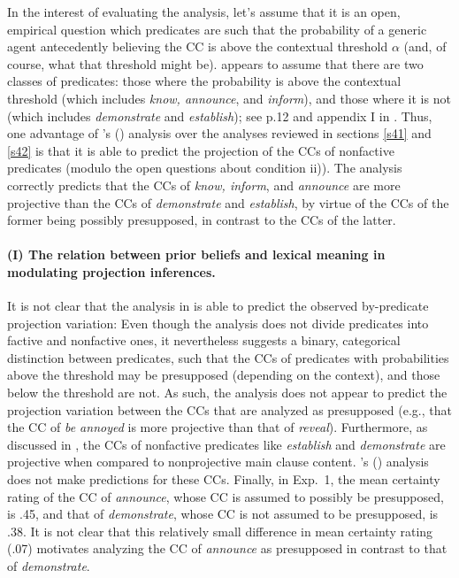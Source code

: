\documentclass[11pt,fleqn]{article}
\newcommand{\6}{\mbox{$[\hspace*{-.6mm}[$}}
\newcommand{\9}{\mbox{$]\hspace*{-.6mm}]$}}
\newcommand{\citetpos}[1]{\citeauthor{#1}'s (\citeyear{#1})}
\begin{document}
In the interest of evaluating the analysis, let's assume that it is an open, empirical question which predicates are such that the probability of a generic agent antecedently believing the CC is above the contextual threshold $\alpha$ (and, of course, what that threshold might be). \cite{schlenker2021} appears to assume that there are two classes of predicates: those where the probability is above the contextual threshold (which includes {\em know, announce}, and {\em inform}), and those where it is not (which includes {\em demonstrate} and {\em establish}); see p.12 and appendix I in \cite{schlenker2021}. Thus, one advantage of \citetpos{schlenker2021} analysis over the analyses reviewed in sections \ref{s41} and \ref{s42} is that it is able to predict the projection of the CCs of nonfactive predicates (modulo the open questions about condition ii)). The analysis correctly predicts that the CCs of \emph{know, inform}, and \emph{announce} are more projective than the CCs of \emph{demonstrate} and \emph{establish}, by virtue of the CCs of the former being possibly presupposed, in contrast to the CCs of the latter. 

\paragraph{(I) The relation between prior beliefs and lexical meaning in modulating projection inferences.} It is not clear that the analysis in \cite{schlenker2021} is able to predict the observed by-predicate projection variation: Even though the analysis does not divide predicates into factive and nonfactive ones, it nevertheless suggests a binary, categorical distinction between predicates, such that the CCs of predicates with probabilities above the threshold may be presupposed (depending on the context), and those below the threshold are not. As such, the analysis does not appear to predict the projection variation between the CCs that are analyzed as presupposed (e.g., that the CC of {\em be annoyed} is more projective than that of {\em reveal}). Furthermore, as discussed in \cite{degen-tonhauser-language}, the CCs of nonfactive predicates like \emph{establish} and \emph{demonstrate} are projective when compared to nonprojective main clause content. \citetpos{schlenker2021} analysis does not make predictions for these CCs. Finally, in Exp.~1, the mean certainty rating of the CC of \emph{announce}, whose CC is assumed to possibly be presupposed, is .45, and that of {\em demonstrate}, whose CC is not assumed to be presupposed, is .38. It is not clear that this relatively small difference in mean certainty rating (.07) motivates analyzing the CC of \emph{announce} as presupposed in contrast to that of \emph{demonstrate}.
\end{document}
